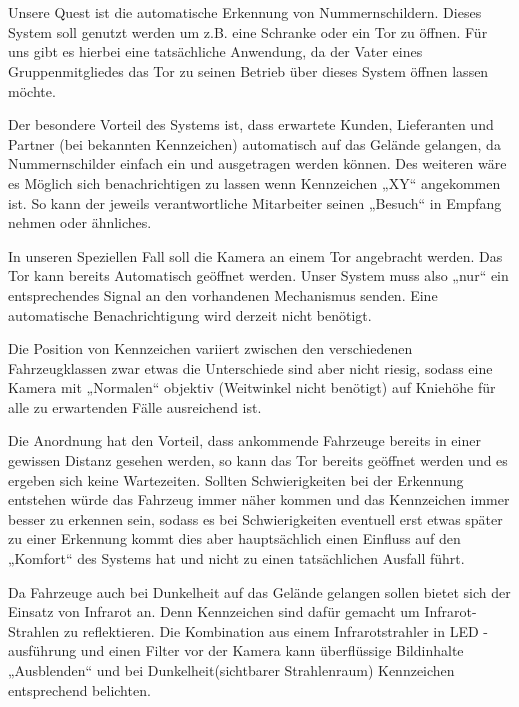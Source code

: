 \documentclass{../Vorlage/sebDenCls}
\begin{document}


\section{}
Unsere Quest ist die automatische Erkennung von Nummernschildern. Dieses System soll genutzt werden um z.B. eine Schranke oder ein Tor zu öffnen. Für uns gibt es hierbei eine tatsächliche Anwendung, da der Vater eines Gruppenmitgliedes das Tor zu seinen Betrieb über dieses System öffnen lassen möchte. 

Der besondere Vorteil des Systems ist, dass erwartete Kunden, Lieferanten und Partner (bei bekannten Kennzeichen) automatisch auf das Gelände gelangen, da Nummernschilder einfach ein und ausgetragen werden können. Des weiteren wäre es Möglich sich benachrichtigen zu lassen wenn Kennzeichen „XY“ angekommen ist. So kann der jeweils verantwortliche Mitarbeiter seinen „Besuch“ in Empfang nehmen oder ähnliches. 

In unseren Speziellen Fall soll die Kamera an einem Tor angebracht werden. Das Tor kann bereits Automatisch geöffnet werden. Unser System muss also „nur“ ein entsprechendes Signal an den vorhandenen Mechanismus senden. Eine automatische Benachrichtigung wird derzeit nicht benötigt. 

Die Position von Kennzeichen variiert zwischen den verschiedenen Fahrzeugklassen zwar etwas die Unterschiede sind aber nicht riesig, sodass eine Kamera mit „Normalen“ objektiv (Weitwinkel nicht benötigt) auf Kniehöhe für alle zu erwartenden Fälle ausreichend ist. 

Die Anordnung hat den Vorteil, dass ankommende Fahrzeuge bereits in einer gewissen Distanz gesehen werden, so kann das Tor bereits geöffnet werden und es ergeben sich keine Wartezeiten. Sollten Schwierigkeiten bei der Erkennung entstehen würde das Fahrzeug immer näher kommen und das Kennzeichen immer besser zu erkennen sein, sodass es bei Schwierigkeiten eventuell erst etwas später zu einer Erkennung kommt dies aber hauptsächlich einen Einfluss auf den „Komfort“ des Systems hat und nicht zu einen tatsächlichen Ausfall führt.

Da Fahrzeuge auch bei Dunkelheit auf das Gelände gelangen sollen bietet sich der Einsatz von Infrarot an. Denn Kennzeichen sind dafür gemacht um Infrarot-Strahlen zu reflektieren. Die Kombination aus einem Infrarotstrahler in LED -ausführung und einen Filter vor der Kamera kann überflüssige Bildinhalte „Ausblenden“ und bei Dunkelheit(sichtbarer Strahlenraum) Kennzeichen entsprechend belichten.
\end{document}
